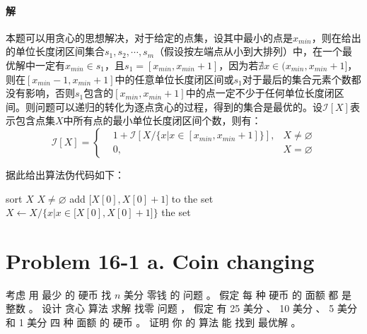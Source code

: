 \documentclass{article}
\begin{document}
\paragraph{解}
本题可以用贪心的思想解决，对于给定的点集，设其中最小的点是$x_{min}$，则在给出的单位长度闭区间集合${s_1,s_2,\cdots,s_m}$（假设按左端点从小到大排列）中，在一个最优解中一定有$x_{min} \in s_1$，且$s_1 = [x_{min}, x_{min} + 1]$，因为若$\nexists x \in (x_{min}, x_{min} + 1]$，则在$[x_{min} - 1, x_{min} + 1]$中的任意单位长度闭区间或$s_1$对于最后的集合元素个数都没有影响，否则$s_1$包含的$[x_{min}, x_{min} + 1]$中的点一定不少于任何单位长度闭区间。则问题可以递归的转化为逐点贪心的过程，得到的集合是最优的。设$\mathcal{I}[X]$表示包含点集$X$中所有点的最小单位长度闭区间个数，则有：
\begin{equation}
	\mathcal{I}[X] =
	\left\{
	\begin{aligned}
		&1 + \mathcal{I}\left[X \Big/ \big\{ x|x \in [x_{min}, x_{min} + 1] \big\} \right], &X \neq \varnothing \\
		&0, &X = \varnothing
	\end{aligned}
	\right.
\end{equation}
\par
据此给出算法伪代码如下：
\begin{codebox}
	\li sort $X$
	\li \While $X \neq \varnothing$
		\Do
	\li 	add $\big[ X[0], X[0] + 1 \big]$ to the set
	\li		$X \gets X \Big/ \Big\{ x|x \in \big[X[0], X[0] + 1 \big] \Big\}$
		\End
	\li \Return the set
\end{codebox}

\section{Problem 16-1 a. Coin changing }
考虑 用 最少 的 硬币 找 $n$ 美分 零钱 的 问题 。 假定 每 种 硬币 的 面额 都 是 整数 。 设计 贪心 算法 求解 找零 问题 ， 假定 有 25 美分 、 10 美分 、 5 美分 和 1 美分 四 种 面额 的 硬币 。 证明 你 的 算法 能 找到 最优解 。
\end{document}
